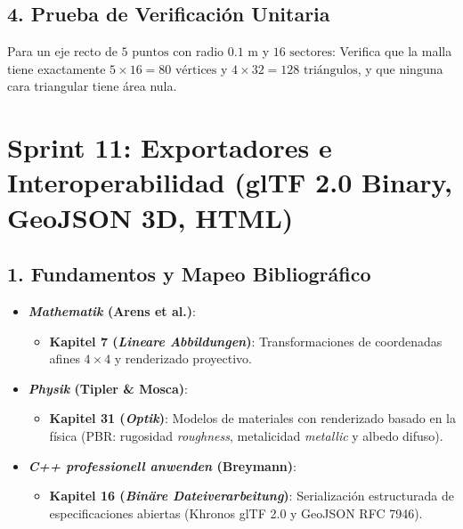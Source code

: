 \documentclass[11pt,a4paper]{article}
\begin{document}
\subsection{4. Prueba de Verificación Unitaria}
Para un eje recto de $5\text{ puntos}$ con radio $0.1\text{ m}$ y $16\text{ sectores}$:
Verifica que la malla tiene exactamente $5 \times 16 = 80\text{ vértices}$ y $4 \times 32 = 128\text{ triángulos}$, y que ninguna cara triangular tiene área nula.

\section{Sprint 11: Exportadores e Interoperabilidad (glTF 2.0 Binary, GeoJSON 3D, HTML)}

\subsection{1. Fundamentos y Mapeo Bibliográfico}
\begin{itemize}
    \item \textbf{\textit{Mathematik} (Arens et al.)}:
    \begin{itemize}
        \item \textbf{Kapitel 7 (\textit{Lineare Abbildungen})}: Transformaciones de coordenadas afines $4 \times 4$ y renderizado proyectivo.
    \end{itemize}
    \item \textbf{\textit{Physik} (Tipler \& Mosca)}:
    \begin{itemize}
        \item \textbf{Kapitel 31 (\textit{Optik})}: Modelos de materiales con renderizado basado en la física (PBR: rugosidad \textit{roughness}, metalicidad \textit{metallic} y albedo difuso).
    \end{itemize}
    \item \textbf{\textit{C++ professionell anwenden} (Breymann)}:
    \begin{itemize}
        \item \textbf{Kapitel 16 (\textit{Binäre Dateiverarbeitung})}: Serialización estructurada de especificaciones abiertas (Khronos glTF 2.0 y GeoJSON RFC 7946).
    \end{itemize}
\end{itemize}
\end{document}
